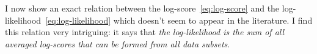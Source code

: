 \documentclass[\ifafour a4paper,12pt,\else a5paper,10pt,\fi%
onecolumn,oneside,article,%
british%
]{memoir}
\theoremstyle{remark}
\theoremstyle{innote}
\newcommand*{\citep}{\parencites}
\newcommand*{\p}{\mathrm{P}}%
\renewcommand*{\|}[1][]{\nonscript\,#1\vert\nonscript\;\mathopen{}}
\newcommand*{\yK}{I}
\begin{document}
\bigskip

I now show an exact relation between the log-score~\eqref{eq:log-score} and
the log-likelihood~\eqref{eq:log-likelihood} which doesn't seem to appear
in the literature. I find this relation very intriguing: it says that
\emph{the log-likelihood is the sum of all averaged log-scores that can be formed
  from all data subsets}.



\bigskip
\end{document}
